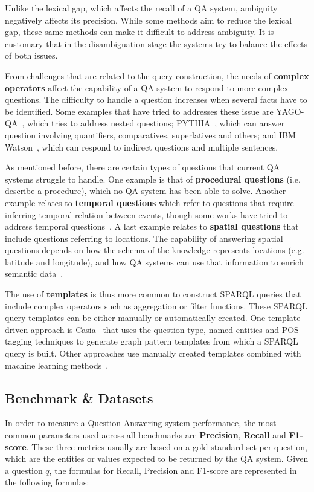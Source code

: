 Unlike the lexical gap, which affects the recall of a QA system, ambiguity negatively affects 
its precision. While some methods aim to reduce the lexical gap, these same methods can make it 
difficult to address ambiguity. It is customary that in the disambiguation stage the systems 
try to balance the effects of both issues.

From challenges that are related to the query construction, the needs of \textbf{complex operators} 
affect the capability of a QA system to respond to more complex questions. The difficulty to 
handle a question increases when several facts have to be identified. Some examples that have 
tried to addresses these issue are YAGO-QA~\cite{qa:AdolphsTSUW11}, which tries to address 
nested questions; PYTHIA~\cite{qa:UngerC11}, which can answer question involving quantifiers, 
comparatives, superlatives and others; and IBM Watson~\cite{qa:GliozzoK12}, which can respond 
to indirect questions and multiple sentences.

As mentioned before, there are certain types of questions that current QA systems struggle to 
handle. One example is that of \textbf{procedural questions} (i.e. describe a procedure), which 
no QA system has been able to solve. Another example relates to \textbf{temporal questions} 
which refer to questions that require inferring temporal relation between events, though some 
works have tried to address temporal questions~\cite{qa:Allen83,qa:FerrandezSKDFNITONMG11,
qa:MeloRN11}. A last example relates to \textbf{spatial questions} that include questions 
referring to locations. The capability of answering spatial questions depends on how the schema 
of the knowledge represents locations (e.g. latitude and longitude), and how QA systems can use 
that information to enrich semantic data~\cite{qa:YounisJTA12,qa:graph-2-ZouHWYHZ14}.

The use of \textbf{templates} is thus more common to construct SPARQL queries that include 
complex operators such as aggregation or filter functions. These SPARQL query templates can be 
either manually or automatically created. One template-driven approach is Casia~\cite{qa:shizhu2014casia} 
that uses the question type, named entities and POS tagging techniques to generate graph 
pattern templates from which a SPARQL query is built. Other approaches use manually created 
templates combined with machine learning methods~\cite{qa:AbachaZ12}. 

\subsection{Benchmark \& Datasets}
In order to measure a Question Answering system performance, the most common parameters used 
across all benchmarks are \textbf{Precision}, \textbf{Recall} and \textbf{F1-score}. These 
three metrics usually are based on a gold standard set per question, which are the entities or 
values expected to be returned by the QA system. Given a question $q$, the formulas for Recall, 
Precision and F1-score are represented in the following formulas:

